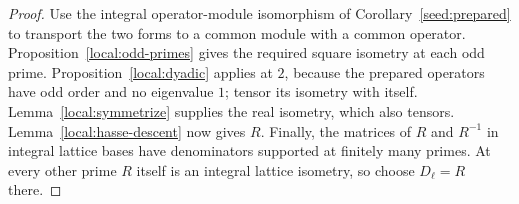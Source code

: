 \begin{proof}
Use the integral operator-module isomorphism of
Corollary~\ref{seed:prepared} to transport the two forms to a common
module with a common operator.  Proposition~\ref{local:odd-primes}
gives the required square isometry at each odd prime.
Proposition~\ref{local:dyadic} applies at $2$, because the prepared
operators have odd order and no eigenvalue $1$; tensor its isometry
with itself.  Lemma~\ref{local:symmetrize} supplies the real isometry,
which also tensors.  Lemma~\ref{local:hasse-descent} now gives $R$.
Finally, the matrices of $R$ and $R^{-1}$ in integral
lattice bases have denominators supported at finitely many primes.
At every other prime $R$ itself is an integral lattice isometry,
so choose $D_\ell=R$ there.
\end{proof}
